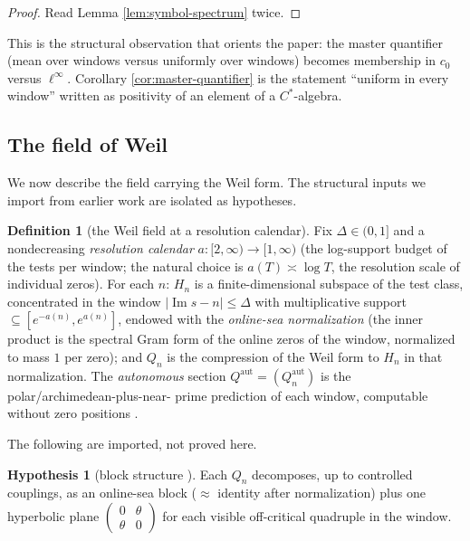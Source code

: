 \documentclass[11pt,reqno]{amsart}
\theoremstyle{definition}
\newtheorem{definition}[theorem]{Definition}
\newtheorem{assumption}[theorem]{Hypothesis}
\newcommand{\Qaut}{Q^{\mathrm{aut}}}
\begin{document}
\begin{proof}
Read Lemma \ref{lem:symbol-spectrum} twice.
\end{proof}

This is the structural observation that orients the paper: the master
quantifier (mean over windows versus uniformly over windows) becomes membership
in \(c_0\) versus \(\ell^\infty\). Corollary \ref{cor:master-quantifier} is the
statement ``uniform in every window'' written as positivity of an element of a
\(C^*\)-algebra.

\subsection{The field of Weil}
We now describe the field carrying the Weil form. The structural inputs we
import from earlier work are isolated as hypotheses.

\begin{definition}[the Weil field at a resolution calendar]\label{def:weil-field}
Fix \(\Delta\in(0,1]\) and a nondecreasing \emph{resolution calendar}
\(a\colon[2,\infty)\to[1,\infty)\) (the log-support budget of the tests per
window; the natural choice is \(a(T)\asymp\log T\), the resolution scale of
individual zeros). For each \(n\): \(H_n\) is a finite-dimensional subspace of
the test class, concentrated in the window \(|\operatorname{Im}s-n|\leq\Delta\)
with multiplicative support \(\subseteq[e^{-a(n)},e^{a(n)}]\), endowed with the
\emph{online-sea normalization} (the inner product is the spectral Gram form of
the online zeros of the window, normalized to mass \(1\) per zero); and \(Q_n\)
is the compression of the Weil form to \(H_n\) in that normalization. The
\emph{autonomous} section \(\Qaut=(\Qaut_n)\) is the polar/archimedean-plus-near-
prime prediction of each window, computable without zero positions
\cite{P39,P40}.
\end{definition}

The following are imported, not proved here.

\begin{assumption}[block structure {\cite{P40}}]\label{hyp:blocks}
Each \(Q_n\) decomposes, up to controlled couplings, as an online-sea block
(\(\approx\) identity after normalization) plus one hyperbolic plane
\(\left(\begin{smallmatrix}0&\theta\\\theta&0\end{smallmatrix}\right)\) for each
visible off-critical quadruple in the window.
\end{assumption}
\end{document}
